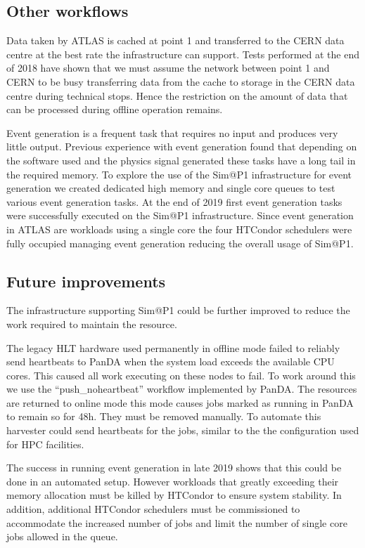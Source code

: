 \documentclass{webofc}
\begin{document}
\subsection{Other workflows}
\label{sec:evgen}
Data taken by ATLAS is cached at point 1 and transferred to the CERN data centre
at the best rate the infrastructure can support. Tests performed at the end of
2018 have shown that we must assume the network between point 1 and CERN to be
busy transferring data from the cache to storage in the CERN data centre
during technical stops. Hence the restriction on the amount of data that can be
processed during offline operation remains.

Event generation is a frequent task that requires no input and produces very
little output. Previous experience with event generation found that depending on
the software used and the physics signal generated these tasks have a long tail
in the required memory. To explore the use of the Sim@P1 infrastructure for
event generation we created dedicated high memory and single core queues to test
various event generation tasks. At the end of 2019 first event generation tasks
were successfully executed on the Sim@P1 infrastructure. Since event generation
in ATLAS are workloads using a single core the four HTCondor schedulers were
fully occupied managing event generation reducing the overall usage of Sim@P1.

\subsection{Future improvements}
The infrastructure supporting Sim@P1 could be further improved to reduce the
work required to maintain the resource.

The legacy HLT hardware used permanently in
offline mode failed to reliably send heartbeats to PanDA when the system load
exceeds the available CPU cores. This
caused all work executing on these nodes to fail. To work around this we use the
``push\_noheartbeat'' workflow implemented by PanDA. The resources are returned
to online mode this mode causes jobs marked as running in PanDA to remain so for
48h. They must be removed manually. To automate this harvester could send
heartbeats for the jobs, similar to the the configuration used for HPC
facilities.

The success in running event generation in late 2019 shows that this could be
done in an automated setup. However workloads that greatly exceeding their
memory
allocation must be killed by HTCondor to ensure system stability. In addition,
additional HTCondor schedulers must be commissioned to accommodate the increased
number of jobs and limit the number of single core jobs allowed in the queue.
\end{document}
